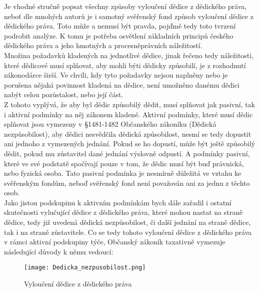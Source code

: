 \documentclass{article}
\begin{document}
Je vhodné stručně popsat všechny způsoby vyloučení dědice z dědického práva, neboť dle mnohých autorů je i samotný svěřenský fond způsob vyloučení dědice z dědického práva. Toto může a nemusí být pravda, pojďmě tedy toto tvrzení podrobit analýze. K tomu je potřeba osvětlení základních principů českého dědického práva a jeho hmotných a procesněprávních náležitostí.\\

Množina požadavků kladených na jednotlivé dědice, jinak řečeno tedy náležitosti, které dědicové musí splňovat, aby mohli býti dědicky způsobilí, je z rozhodnutí zákonodárce širší. Ve chvíli, kdy tyto požadavky nejsou naplněny nebo je porušena nějaká povinnost kladená na dědice, není umožněno danému dědici nabýt celou pozůstalost, nebo její část. \\

Z tohoto vyplývá, že aby byl dědic způsobilý dědit, musí splňovat jak pasivní, tak i aktivní podmínky na něj zákonem kladené. Aktivní podmínky, které musí dědic splňovat jsou vymezeny v §1481-1482 Občanského zákoníku (Dědická nezpůsobilost), aby dědici nesvědčila dědická způsobilost, nesmí se tedy dopustit ani jednoho z vymezených jednání. Pokud se ho dopustí, může být ještě způsobilý dědit, pokud mu zůstavitel dané jednání výslovně odpustí. A podmínky pasivní, které ve své podstatě spočívají pouze v tom, že dědic musí být buď právnická, nebo fyzická osoba. Tato pasivní podmínka je nesmírně důležitá ve vztahu ke svěřenským fondům, neboď svěřenský fond není považován ani za jednu z těchto osob.\\


Jako jistou podskupinu k aktivním podmínkám bych dále zařadil i ostatní skutečnosti vylučující dědice z dědického práva, které mohou nastat na straně dědice, tedy již uvedená dědická nezpůsobilost, či další jednání na straně dědice, tak i na straně zůstavitele. Co se tedy tohoto vyloučení dědice z dědického práva v rámci aktivní podskupiny týče, Občanský zákoník taxativně vymezuje následující důvody k němu vedoucí:

\begin{figure}[h]
\centering
\texttt{[image: Dedicka\_nezpusobilost.png]}
\caption[Vyloučení dědice z dědického práva]{Vyloučení dědice z dědického práva}
\label{fig:komparace}
\end{figure}
\end{document}
